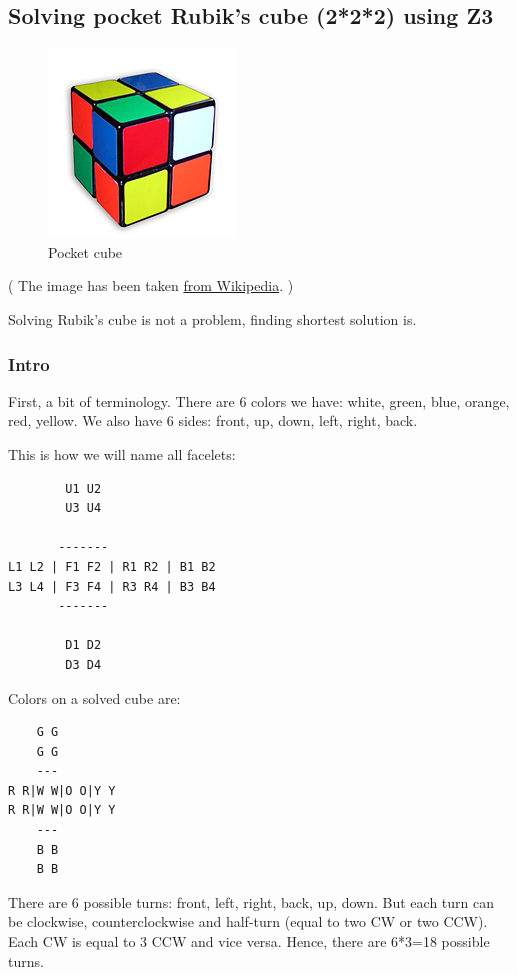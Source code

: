 \subsection{Solving pocket Rubik’s cube (2*2*2) using Z3}
\label{PocketCubeSMT}

\begin{figure}[H]
\centering
\includegraphics[scale=0.75]{SMT/rubik2/failed/190px-Pocket_cube_scrambled.jpg}
\caption{Pocket cube}
\end{figure}

( The image has been taken \href{https://en.wikipedia.org/wiki/Pocket_Cube}{from Wikipedia}. )

Solving Rubik's cube is not a problem, finding shortest solution is.

\subsubsection{Intro}

First, a bit of terminology.
There are 6 colors we have: white, green, blue, orange, red, yellow.
We also have 6 sides: front, up, down, left, right, back.

This is how we will name all facelets:

\begin{lstlisting}
        U1 U2
        U3 U4

       -------
L1 L2 | F1 F2 | R1 R2 | B1 B2
L3 L4 | F3 F4 | R3 R4 | B3 B4
       -------

        D1 D2
        D3 D4
\end{lstlisting}

Colors on a solved cube are:

\begin{lstlisting}
    G G
    G G
    ---
R R|W W|O O|Y Y
R R|W W|O O|Y Y
    ---
    B B
    B B
\end{lstlisting}

There are 6 possible turns: front, left, right, back, up, down.
But each turn can be clockwise, counterclockwise and half-turn (equal to two CW or two CCW).
Each CW is equal to 3 CCW and vice versa.
Hence, there are 6*3=18 possible turns.

